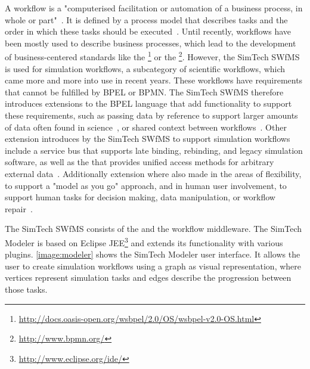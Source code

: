 A workflow is a "computerised facilitation or automation of a business process, in whole or part"~\autocite[p.~6]{workflow:referencemodel}.
It is defined by a process model that describes tasks and the order in which these tasks should be executed~\autocite[pp.~7-8]{workflow:referencemodel}.
Until recently, workflows have been mostly used to describe business processes, which lead to the development of business-centered standards like the \footnote{\url{http://docs.oasis-open.org/wsbpel/2.0/OS/wsbpel-v2.0-OS.html}} or the \footnote{\url{http://www.bpmn.org/}}.
However, the SimTech SWfMS is used for simulation workflows, a subcategory of scientific workflows, which came more and more into use in recent years.
These workflows have requirements that cannot be fulfilled by BPEL or BPMN.
The SimTech SWfMS therefore introduces extensions to the BPEL language that add functionality to support these requirements, such as passing data by reference to support larger amounts of data often found in science~\autocite[also~see][]{workflow:simulation:modelling:datareferences}, or shared context between workflows~\autocite{workflow:simulation:modelling}.
Other extension introduces by the SimTech SWfMS to support simulation workflows include a service bus that supports late binding, rebinding, and legacy simulation software, as well as the  that provides unified access methods for arbitrary external data~\autocite{workflow:simulation:runtime}.
Additionally extension where also made in the areas of flexibility, to support a "model as you go" approach, and in human user involvement, to support human tasks for decision making, data manipulation, or workflow repair~\autocites{workflow:simulation:flexibility}{workflow:simulation:humanusers}.

The SimTech SWfMS consists of the  and the workflow middleware.
The SimTech Modeler is based on Eclipse JEE\footnote{\url{http://www.eclipse.org/ide/}} and extends its functionality with various plugins.
\autoref{image:modeler} shows the SimTech Modeler user interface.
It allows the user to create simulation workflows using a graph as visual representation, where vertices represent simulation tasks and edges describe the progression between those tasks.

